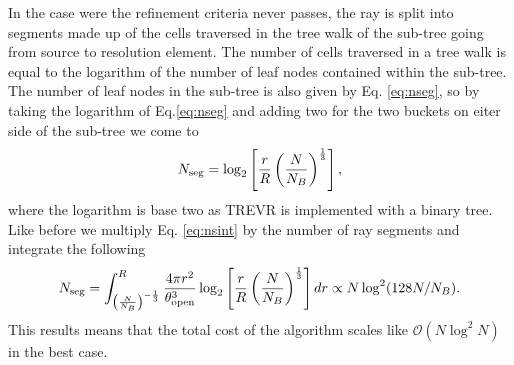\documentclass[fleq,usenatbib]{mnras}
\newcommand{\acro}{TREVR}
\newcommand{\bigO}[1]{\mathcal{O}\left(#1\right)}
\begin{document}
In the case were the refinement criteria never passes, the ray is split into 
segments made up of the cells traversed in the tree walk of the sub-tree going 
from source to resolution element. The number of cells traversed in a tree walk
is equal to the logarithm of the number of leaf nodes contained within the 
sub-tree. The number of leaf nodes in the sub-tree is also given by Eq. 
\ref{eq:nseg}, so by taking the logarithm of Eq.\ref{eq:nseg} and adding two 
for the two buckets on eiter side of the sub-tree we come to
\begin{equation}
\label{eq:nseg2}
N_{\rm seg} = \log_2\left[\frac{r}{R}\left(
\frac{N}{N_B}\right)^\frac{1}{3}\right],
\end{equation}
where the logarithm is base two as \acro{} is implemented with a binary tree. 
Like before we multiply Eq. \ref{eq:nsint} by the number of ray segments and 
integrate the following
\begin{equation}
\label{eq:nsegint2}
N_{\rm seg} = \int_{\left(\frac{N}{N_B}\right)^{-\frac{1}{3}}}^R 
\frac{4\pi r^2}{\theta_{\rm open}^3}
\log_2\left[\frac{r}{R}\left(
\frac{N}{N_B}\right)^\frac{1}{3}\right] dr
\propto N\log^2(128 N/N_B).
\end{equation}
This results means that the total cost of the algorithm scales like 
$\bigO{N\log^2N}$ in the best case.
\end{document}
